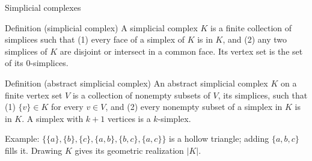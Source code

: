 \documentclass[aspectratio=169]{beamer}
\newcommand{\src}[1]{\par\vspace{2pt}\hfill{\scriptsize\textcolor{gray}{\parencite{#1}}}}
\begin{document}
\begin{frame}{Simplicial complexes}
\begin{block}{Definition (simplicial complex)}
A \alert{simplicial complex} $K$ is a finite collection of simplices such that (1) every face of a simplex of $K$ is in $K$, and (2) any two simplices of $K$ are disjoint or intersect in a common face. Its \alert{vertex set} is the set of its 0-simplices.
\src{edelsbrunnerletscherzomorodian2002}
\end{block}
\begin{block}{Definition (abstract simplicial complex)}
An \alert{abstract simplicial complex} $K$ on a finite vertex set $V$ is a collection of nonempty subsets of $V$, its simplices, such that
(1) $\{v\} \in K$ for every $v \in V$, and (2) every nonempty subset of a simplex in $K$ is in $K$. A simplex with $k+1$ vertices is a $k$-simplex.
\src{zomorodiancarlsson2005}
\end{block}
{\small Example: $\{\{a\},\{b\},\{c\},\{a,b\},\{b,c\},\{a,c\}\}$ is a hollow triangle; adding $\{a,b,c\}$ fills it. Drawing $K$ gives its \alert{geometric realization} $|K|$.}
\end{frame}
\end{document}

